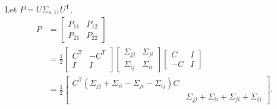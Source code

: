 \documentclass[xcolor=x11names]{article}
\DeclareMathOperator\T{\mathsf{T}}
\begin{document}
   
    Let $P =  U \Sigma_{s,11} U^{\T} $, 
    \begin{align*}
       P &=         
       \begin{bmatrix} 
            P_{11}  & P_{12}\\
            P_{21} & P_{22}
       \end{bmatrix} \\
       &= \frac{1}{2}
         \begin{bmatrix} 
            C^{\T} & -C^{\T}  \\
             I & I
         \end{bmatrix}
         \begin{bmatrix} 
            \Sigma_{jj} & \Sigma_{ji} \\
            \Sigma_{ij} & \Sigma_{ii}
         \end{bmatrix}
         \begin{bmatrix} 
            C & I \\
            -C & I
         \end{bmatrix} \\
       &= \frac{1}{2}
       \begin{bmatrix} 
           C^{\T}\left(\Sigma_{jj} + \Sigma_{ii} - \Sigma_{ji} - \Sigma_{ij}\right) C & \\
             & \Sigma_{jj} + \Sigma_{ii} + \Sigma_{ji} + \Sigma_{ij}
       \end{bmatrix}.
    \end{align*}    
    
    
    
\end{document}

